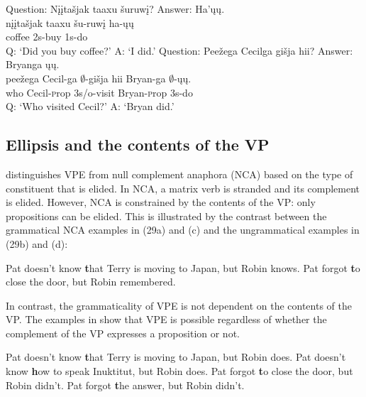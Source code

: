 \documentclass[output=paper]{LSP/langsci}
\begin{document}
\begin{exe}
\ex
\begin{xlist}
\ex
\glll Question: {Nįįtašjak taaxu} šuruwį? Answer: Ha'ųų.\\
{} {nįįtašjak taaxu} šu-ruwį {} ha-ųų\\
{} coffee {\textsc 2s}-buy {} {\textsc 1s}-do\\
 \trans Q: `Did you buy coffee?' A: `I did.'
\ex
\glll Question: Peežega Cecilga {gišja hii}? Answer: Bryanga ųų.\\
{} peežega Cecil-ga $\emptyset$-{gišja hii} {} Bryan-ga $\emptyset$-ųų.\\
{} who Cecil-{\textsc prop} {\textsc 3s/o}-visit {} Bryan-{\textsc prop} {\textsc 3s}-do\\
\trans Q: `Who visited Cecil?' A: `Bryan did.'
\end{xlist}
\end{exe}


\subsection{Ellipsis and the contents of the VP}

\citet{Goldberg2005} distinguishes VPE from null complement anaphora (NCA) based on the type of constituent that is elided. In NCA, a matrix verb is stranded and its complement is elided. However, NCA is constrained by the contents of the VP: only propositions can be elided. This is illustrated by the contrast between the grammatical NCA examples in (29a) and (c) and the ungrammatical examples in (29b) and (d):

\begin{exe}
\ex
\begin{xlist}
\ex
Pat doesn't know {\textbf that Terry is moving to Japan}, but Robin knows.
\ex
Pat forgot {\textbf to close the door}, but Robin remembered.
\end{xlist}
\end{exe}

In contrast, the grammaticality of VPE is not dependent on the contents of the VP. The examples in  show that VPE is possible regardless of whether the complement of the VP expresses a proposition or not.

\begin{exe}
\ex
\begin{xlist}
\ex
Pat doesn't know {\textbf that Terry is moving to Japan}, but Robin does.
\ex
Pat doesn't know {\textbf how to speak Inuktitut}, but Robin does.
\ex
Pat forgot {\textbf to close the door}, but Robin didn't.
\ex
Pat forgot {\textbf the answer}, but Robin didn't.
\end{xlist}
\end{exe}
\end{document}
